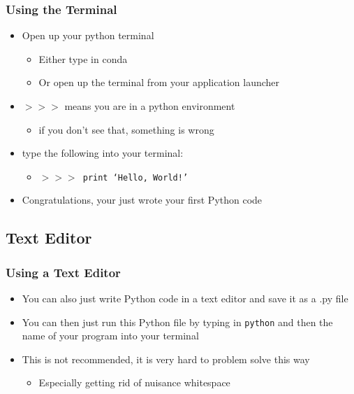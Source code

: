 \documentclass[mini frame in current subsection]{beamer}
\begin{document}
		\begin{frame}
			\frametitle{Using the Terminal}
			\begin{itemize}
				\vfill \item  Open up your python terminal
					\begin{itemize}
						\item  Either type in conda
						\item  Or open up the terminal from your application launcher
					\end{itemize}
				\vfill \item  \texttt{$>>>$} means you are in a python environment
					\begin{itemize}
						\item  if you don't see that, something is wrong
					\end{itemize}
				\vfill \item  type the following into your terminal:
					\begin{itemize}
						\item  \texttt{$>>>$ print `Hello, World!'}
					\end{itemize}
				\vfill \item  Congratulations, your just wrote your first Python code
			\end{itemize}
		\end{frame}
		
	\subsection{Text Editor}
	
		\begin{frame}
			\frametitle{Using a Text Editor}
			\begin{itemize}
				\vfill \item  You can also just write Python code in a text editor and save it as a .py file
				\vfill \item  You can then just run this Python file by typing in \texttt{python} and then the name of your program into your terminal
				\vfill \item  This is not recommended, it is very hard to problem solve this way
					\begin{itemize}
						\item  Especially getting rid of nuisance whitespace
					\end{itemize}
			\end{itemize}
		\end{frame}
		
\end{document}
